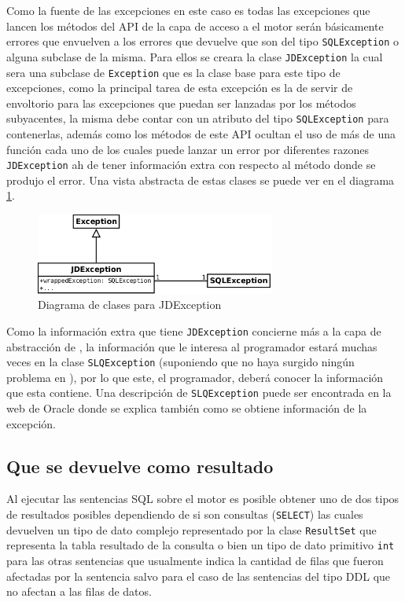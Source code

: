 Como la fuente de las excepciones en este caso es \jd todas las excepciones que lancen los métodos del API de la capa de acceso a el motor serán básicamente errores que envuelven a los  errores que devuelve \jd que son del tipo \verb=SQLException= o alguna subclase de la misma. Para ellos se creara la clase \verb=JDException= la cual sera una subclase de \verb=Exception= que es la clase base para este tipo de excepciones, como la principal tarea de esta excepción es la de servir de envoltorio para las excepciones que puedan ser lanzadas por los métodos subyacentes, la misma debe contar con un atributo del tipo \verb=SQLException= para contenerlas, además como los métodos de este API ocultan el uso de más de una función cada uno de los cuales puede lanzar un error por diferentes razones \verb=JDException= ah de tener información extra con respecto al método donde se produjo el error. Una vista abstracta de estas clases se puede ver en el diagrama \ref{fig:jdbgm-exception}.
%
\begin{figure}[h]
  \centering
    \includegraphics[width=0.7\textwidth]{figuras/jdbgm-exception.png}
  \caption{Diagrama de clases para JDException}
  \label{fig:jdbgm-exception}
\end{figure}

Como la información extra que tiene \verb=JDException= concierne más a la capa de abstracción de \jj, la información que le interesa al programador estará muchas veces en la clase \verb=SLQException= (suponiendo que no haya surgido ningún problema en \jj), por lo que este, el programador, deberá conocer la información que esta contiene. Una descripción de \verb=SLQException= puede ser encontrada en la web de Oracle\citep{java:exeptions} donde se explica también como se obtiene información de la excepción.
%
\subsection{Que se devuelve como resultado}
Al ejecutar las sentencias SQL sobre el motor es posible obtener uno de dos tipos de resultados posibles dependiendo de si son consultas (\verb=SELECT=) las cuales devuelven un tipo de dato complejo representado por la clase \verb=ResultSet= que representa la tabla resultado de la consulta o bien un tipo de dato primitivo \verb=int= para las otras sentencias que usualmente indica la cantidad de filas que fueron afectadas por la sentencia salvo para el caso de las sentencias del tipo DDL que no afectan a las filas de datos.

